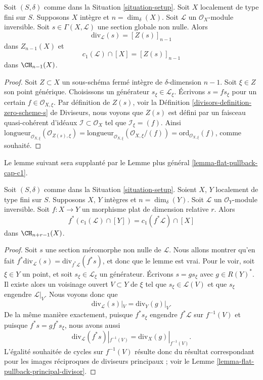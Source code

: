 \begin{lemma}
\label{lemma-compute-c1}
Soit $(S, \delta)$ comme dans la Situation \ref{situation-setup}.
Soit $X$ localement de type fini sur $S$. Supposons $X$
intègre et $n = \dim_\delta(X)$.
Soit $\mathcal{L}$ un $\mathcal{O}_X$-module inversible.
Soit $s \in \Gamma(X, \mathcal{L})$ une section globale non nulle.
Alors
$$
\text{div}_\mathcal{L}(s) = [Z(s)]_{n - 1}
$$
dans $Z_{n - 1}(X)$ et
$$
c_1(\mathcal{L}) \cap [X] = [Z(s)]_{n - 1}
$$
dans $\CH_{n - 1}(X)$.
\end{lemma}

\begin{proof}
Soit $Z \subset X$ un sous-schéma fermé intègre de
$\delta$-dimension $n - 1$. Soit $\xi \in Z$ son point
générique. Choisissons un générateur $s_\xi \in \mathcal{L}_\xi$.
Écrivons $s = fs_\xi$ pour un certain $f \in \mathcal{O}_{X, \xi}$.
Par définition de $Z(s)$, voir la
Définition \ref{divisors-definition-zero-scheme-s} de Diviseurs,
nous voyons que $Z(s)$ est défini par un faisceau quasi-cohérent
d'idéaux $\mathcal{I} \subset \mathcal{O}_X$ tel
que $\mathcal{I}_\xi = (f)$. Ainsi
$\text{longueur}_{\mathcal{O}_{X, \xi}}(\mathcal{O}_{Z(s), \xi})
=
\text{longueur}_{\mathcal{O}_{X, \xi}}(\mathcal{O}_{X, \xi}/(f))
=
\text{ord}_{\mathcal{O}_{X, \xi}}(f)$, comme souhaité.
\end{proof}

\noindent
Le lemme suivant sera supplanté par le Lemme plus général
\ref{lemma-flat-pullback-cap-c1}.

\begin{lemma}
\label{lemma-flat-pullback-divisor-invertible-sheaf}
Soit $(S, \delta)$ comme dans la Situation \ref{situation-setup}.
Soient $X$, $Y$ localement de type fini sur $S$. Supposons $X$, $Y$
intègres et $n = \dim_\delta(Y)$.
Soit $\mathcal{L}$ un $\mathcal{O}_Y$-module inversible.
Soit $f : X \to Y$ un morphisme plat de dimension relative $r$. Alors
$$
f^*(c_1(\mathcal{L}) \cap [Y]) = c_1(f^*\mathcal{L}) \cap [X]
$$
dans $\CH_{n + r - 1}(X)$.
\end{lemma}

\begin{proof}
Soit $s$ une section méromorphe non nulle de $\mathcal{L}$.
Nous allons montrer qu'en fait
$f^*\text{div}_\mathcal{L}(s) = \text{div}_{f^*\mathcal{L}}(f^*s)$,
et donc que le lemme est vrai.
Pour le voir, soit $\xi \in Y$ un point, et soit $s_\xi \in \mathcal{L}_\xi$
un générateur. Écrivons $s = gs_\xi$ avec $g \in R(Y)^*$.
Il existe alors un voisinage ouvert $V \subset Y$ de $\xi$
tel que $s_\xi \in \mathcal{L}(V)$ et que $s_\xi$ engendre
$\mathcal{L}|_V$. Nous voyons donc que
$$
\text{div}_\mathcal{L}(s)|_V = \text{div}_Y(g)|_V.
$$
De la même manière exactement, puisque $f^*s_\xi$ engendre $f^*\mathcal{L}$
sur $f^{-1}(V)$ et puisque $f^*s = g f^*s_\xi$, nous
avons aussi
$$
\text{div}_\mathcal{L}(f^*s)|_{f^{-1}(V)}
=
\text{div}_X(g)|_{f^{-1}(V)}.
$$
L'égalité souhaitée de cycles sur $f^{-1}(V)$ résulte donc du
résultat correspondant pour les images réciproques de diviseurs principaux ; voir le
Lemme \ref{lemma-flat-pullback-principal-divisor}.
\end{proof}




